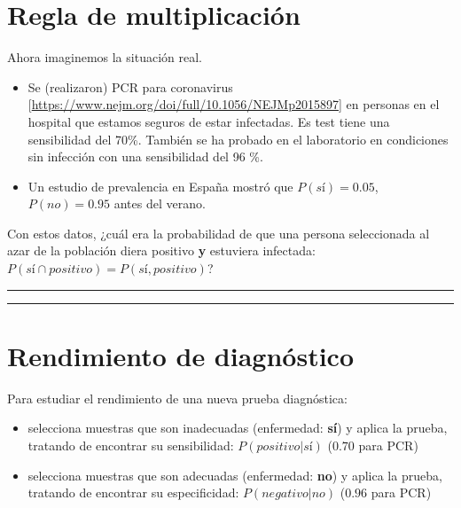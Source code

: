 \documentclass[
]{book}
\begin{document}
\hypertarget{regla-de-multiplicaciuxf3n}{%
\section{Regla de multiplicación}\label{regla-de-multiplicaciuxf3n}}

Ahora imaginemos la situación real.

\begin{itemize}
\item
  Se (realizaron) PCR para coronavirus {[}\url{https://www.nejm.org/doi/full/10.1056/NEJMp2015897}{]} en personas en el hospital que estamos seguros de estar infectadas. Es test tiene una sensibilidad del 70\%. También se ha probado en el laboratorio en condiciones sin infección con una sensibilidad del 96 \%.
\item
  Un estudio de prevalencia en España mostró que \(P(sí)=0.05\), \(P(no)=0.95\) antes del verano.
\end{itemize}

Con estos datos, ¿cuál era la probabilidad de que una persona seleccionada al azar de la población diera positivo \textbf{y} estuviera infectada: \(P(sí \cap positivo)=P(sí, positivo)\)?

\begin{center}\rule{0.5\linewidth}{0.5pt}\end{center}

\begin{center}\rule{0.5\linewidth}{0.5pt}\end{center}

\hypertarget{rendimiento-de-diagnuxf3stico}{%
\section{Rendimiento de diagnóstico}\label{rendimiento-de-diagnuxf3stico}}

Para estudiar el rendimiento de una nueva prueba diagnóstica:

\begin{itemize}
\item
  selecciona muestras que son inadecuadas (enfermedad: \textbf{sí}) y aplica la prueba, tratando de encontrar su sensibilidad: \(P(positivo|sí)\) (\(0.70\) para PCR)
\item
  selecciona muestras que son adecuadas (enfermedad: \textbf{no}) y aplica la prueba, tratando de encontrar su especificidad: \(P(negativo|no)\) (\(0.96\) para PCR)
\end{itemize}
\end{document}
